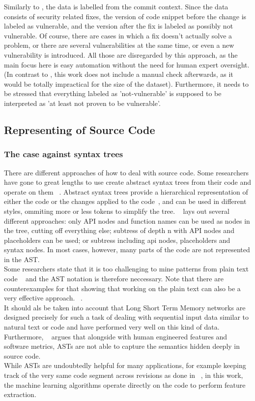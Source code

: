 \documentclass[
	a4paper,
	pagesize,
	pdftex,
	12pt,
	twoside, %
	BCOR=5mm, %
	ngerman,
	fleqn,
	final,
	]{scrartcl}
\begin{document}
Similarly to \cite{Li.2018}, the data is labelled from the commit context. Since the data consists of security related fixes, the version of code snippet before the change is labeled as vulnerable, and the version after the fix is labeled as possibly not vulnerable. Of course, there are cases in which a fix doesn't actually solve a problem, or there are several vulnerabilities at the same time, or even a new vulnerability is introduced. All those are disregarded by this approach, as the main focus here is easy automation without the need for human expert oversight. (In contrast to \cite{Li.2018}, this work does not include a manual check afterwards, as it would be totally impractical for the size of the dataset). Furthermore, it needs to be stressed that everything labeled as 'not-vulnerable' is supposed to be interpreted as 'at least not proven to be vulnerable'. 

\subsection{Representing of Source Code}


\subsubsection{The case against syntax trees}
There are different approaches of how to deal with source code. Some researchers have gone to great lengths to use create abstract syntax trees from their code and operate on them ~\cite{Ma.2017,Yamaguchi.2012}. Abstract syntax trees provide a hierarchical representation of either the code or the changes applied to the code~\cite{Liu.2018}, and can be used in different styles, ommiting more or less tokens to simplify the tree. ~\cite{Yamaguchi.2012} lays out several different approaches: only API nodes and function names can be used as nodes in the tree, cutting off everything else; subtress of depth n with API nodes and placeholders can be used; or subtress including api nodes, placeholders and syntax nodes. In most cases, however, many parts of the code are not represented in the AST.\\
Some researchers state that it is too challenging to mine patterns from plain text code ~\cite{Liu.2018} and the AST notation is therefore neccessary. Note that there are counterexamples for that showing that working on the plain text can also be a very effective approach. ~\cite{Russell.2018,Hovsepyan.2012}.\\
It should als be taken into account that Long Short Term Memory networks are designed precisely for such a task of dealing with sequential input data similar to natural text or code and have performed very well on this kind of data. Furthermore, ~\cite{Dam.2016} argues that alongside with human engineered features and software metrics, ASTs are not able to capture the semantics hidden deeply in source code. \\
While ASTs are undoubtedly helpful for many applications, for example keeping track of the very same code segment across revisions as done in ~\cite{Liu.2018}, in this work, the machine learning algorithms operate directly on the code to perform feature extraction. 
\end{document}
